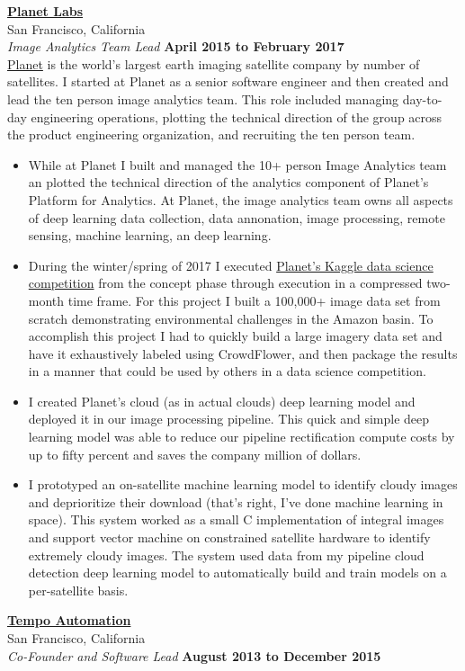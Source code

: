 \documentclass[10pt]{article}
\newenvironment{outerlist}[1][\enskip\textbullet]%
        {\begin{itemize}[#1]}{\end{itemize}%
         \vspace{-.6\baselineskip}}
\newcommand{\blankline}{\quad\pagebreak[2]}
\begin{document}
\href{http://www.planet.com/}{\textbf{Planet Labs}} \\
San Francisco, California \\
\textit{Image Analytics Team Lead}%
        \hfill \textbf{April 2015 to February 2017}  \\

\blankline
\newline
\href{http://www.planet.com}{Planet} is the world's largest earth imaging satellite company by number of satellites. I started at Planet as a senior software engineer and then created and lead the ten person image analytics team. This role included managing day-to-day engineering operations, plotting the technical direction of the group across the product engineering organization, and recruiting the ten person team. 
\\
\begin{outerlist}
\item While at Planet I built and managed the 10+ person Image Analytics team an plotted the technical direction of the analytics component of Planet's Platform for Analytics. At Planet, the image analytics team owns all aspects of deep learning data collection, data annonation, image processing, remote sensing, machine learning, an deep learning.  
\item During the winter/spring of 2017 I executed \href{https://www.kaggle.com/c/planet-understanding-the-amazon-from-space}{Planet's Kaggle data science competition} from the concept phase through execution in a compressed two-month time frame. For this project I built a 100,000+ image data set from scratch demonstrating environmental challenges in the Amazon basin. To accomplish this project I had to quickly build a large imagery data set and have it exhaustively labeled using CrowdFlower, and then package the results in a manner that could be used by others in a data science competition.   
\item I created Planet's cloud (as in actual clouds) deep learning model and deployed it in our image processing pipeline. This quick and simple deep learning model was able to reduce our pipeline rectification compute costs by up to fifty percent and saves the company million of dollars. 
\item I prototyped an on-satellite machine learning model to identify cloudy images and deprioritize their download (that's right, I've done machine learning in space). This system worked as a small C implementation of integral images and support vector machine on constrained satellite hardware to identify extremely cloudy images. The system used data from my pipeline cloud detection deep learning model to automatically build and train models on a per-satellite basis.   
\end{outerlist}
\blankline
\newline
\href{http://www.tempoautomation.com/}{\textbf{Tempo Automation}} \\
San Francisco, California \\
\textit{Co-Founder and Software Lead}%
        \hfill \textbf{August 2013 to December 2015}  \\
\end{document}
